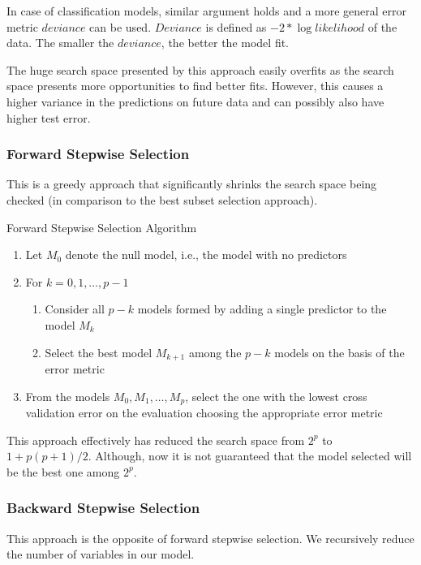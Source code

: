 \documentclass[11pt, a4paper]{article}
\begin{document}
    In case of classification models, similar argument holds and a more general error metric $deviance$ can be used. $Deviance$ is defined as $-2 * \log likelihood$ of the data. The smaller the $deviance$, the better the model fit.\newline

    The huge search space presented by this approach easily overfits as the search space presents more opportunities to find better fits. However, this causes a higher variance in the predictions on future data and can possibly also have higher test error.

    
    \subsubsection{Forward Stepwise Selection}
    This is a greedy approach that significantly shrinks the search space being checked (in comparison to the best subset selection approach).

    Forward Stepwise Selection Algorithm
    \begin{enumerate}
        \item Let $M_{0}$ denote the null model, i.e., the model with no predictors
        \item For $k = 0, 1, \ldots, p - 1$
        \begin{enumerate}
            \item Consider all $p - k$ models formed by adding a single predictor to the model $M_{k}$
            \item Select the best model $M_{k+1}$ among the $p - k$ models on the basis of the error metric
        \end{enumerate}
        \item From the models $M_{0}, M_{1}, \ldots, M_{p}$, select the one with the lowest cross validation error on the evaluation choosing the appropriate error metric
    \end{enumerate}

    This approach effectively has reduced the search space from $2^{p}$ to $1 + p(p+1)/2$. Although, now it is not guaranteed that the model selected will be the best one among $2^{p}$.


    \subsubsection{Backward Stepwise Selection}
    This approach is the opposite of forward stepwise selection. We recursively reduce the number of variables in our model.
\end{document}
